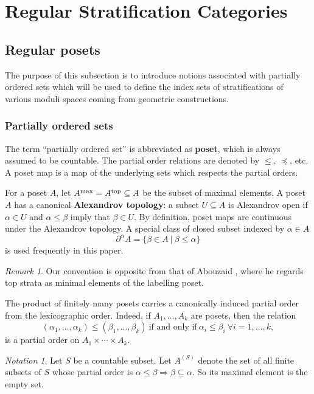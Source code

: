 \documentclass[reqno, 10pt]{amsart}
\numberwithin{equation}{section}
\numberwithin{equation}{section}
\renewcommand{\subset}{\subseteq}
\theoremstyle{definition}
\theoremstyle{remark}
\newtheorem{rem}[thm]{Remark}
\newtheorem{notation}[thm]{Notation}
\newcommand{\beqn}{\begin{equation*}}
\newcommand{\eeqn}{\end{equation*}}
\begin{document}
\section{Regular Stratification Categories}


\subsection{Regular posets}

The purpose of this subsection is to introduce notions associated with partially ordered sets which will be used to define the index sets of stratifications of various moduli spaces coming from geometric constructions.

\subsubsection{Partially ordered sets}

The term ``partially ordered set'' is abbreviated as {\bf poset}, which is always assumed to be countable. The partial order relations are denoted by $\leq$, $\preceq$, etc. A poset map is a map of the underlying sets which respects the partial orders.

For a poset $A$, let $A^{\max} = A^{\rm top} \subseteq A$ be the subset of maximal elements. A poset $A$ has a canonical {\bf Alexandrov topology}: a subset $U \subset A$ is Alexandrov open if $\alpha \in U$ and $\alpha \leq \beta$ imply that $\beta \in U$. By definition, poset maps are continuous under the Alexandrov topology. A special class of closed subset indexed by $\alpha \in A$
\beqn
\partial^\alpha A = \{ \beta \in A\ |\ \beta \leq \alpha \}
\eeqn
is used frequently in this paper.

\begin{rem}
Our convention is opposite from that of Abouzaid \cite{Abouzaid_axiomatic}, where he regards top strata as minimal elements of the labelling poset. 
\end{rem}

The product of finitely many posets carries a canonically induced partial order from the lexicographic order. Indeed, if $A_1, \ldots, A_k$ are posets, then the relation 
\beqn
(\alpha_1, \ldots, \alpha_k) \leq ( \beta_1, \ldots, \beta_k )\ \text{if and only if}\ \alpha_i \leq \beta_i\ \forall i = 1, \ldots, k,
\eeqn
is a partial order on $A_1 \times \cdots \times A_k$. 


\begin{notation}\label{notation21}
Let $S$ be a countable subset. Let $A^{(S)}$ denote the set of all finite subsets of $S$ whose partial order is $\alpha \leq \beta \Longrightarrow \beta \subseteq \alpha$. So its maximal element is the empty set.
\end{notation}
\end{document}
